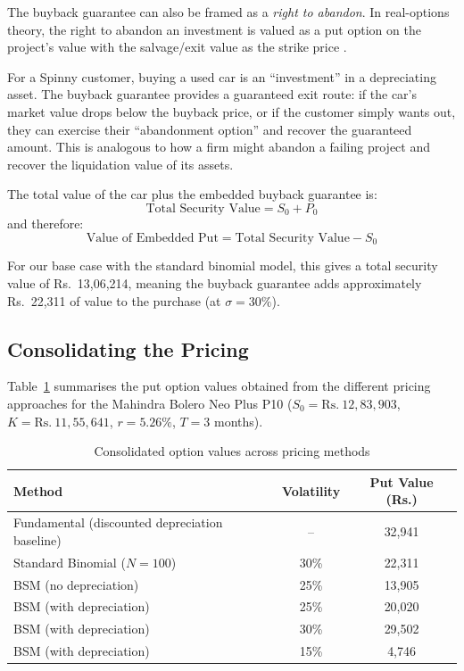 \documentclass[11pt, a4paper]{article}
\begin{document}
The buyback guarantee can also be framed as a \emph{right to abandon}. In real-options theory, the right to abandon an investment is valued as a put option on the project's value with the salvage/exit value as the strike price \cite{dixitpindyck1994, myers1977}.

For a Spinny customer, buying a used car is an ``investment'' in a depreciating asset. The buyback guarantee provides a guaranteed exit route: if the car's market value drops below the buyback price, or if the customer simply wants out, they can exercise their ``abandonment option'' and recover the guaranteed amount. This is analogous to how a firm might abandon a failing project and recover the liquidation value of its assets.

The total value of the car plus the embedded buyback guarantee is:
\begin{equation}
    \text{Total Security Value} = S_0 + P_0
\end{equation}
and therefore:
\begin{equation}
    \text{Value of Embedded Put} = \text{Total Security Value} - S_0
\end{equation}

For our base case with the standard binomial model, this gives a total security value of Rs.~13,06,214, meaning the buyback guarantee adds approximately Rs.~22,311 of value to the purchase (at $\sigma = 30\%$).


\subsection{Consolidating the Pricing}
\label{sec:consolidation}

Table~\ref{tab:consolidation} summarises the put option values obtained from the different pricing approaches for the Mahindra Bolero Neo Plus P10 ($S_0 = \text{Rs.}~12{,}83{,}903$, $K = \text{Rs.}~11{,}55{,}641$, $r = 5.26\%$, $T = 3$ months).

\begin{table}[H]
\centering
\caption{Consolidated option values across pricing methods}
\label{tab:consolidation}
\begin{tabular}{@{}lcc@{}}
\toprule
\textbf{Method} & \textbf{Volatility} & \textbf{Put Value (Rs.)} \\
\midrule
Fundamental (discounted depreciation baseline) & -- & 32,941 \\
Standard Binomial ($N = 100$) & 30\% & 22,311 \\
BSM (no depreciation) & 25\% & 13,905 \\
BSM (with depreciation) & 25\% & 20,020 \\
BSM (with depreciation) & 30\% & 29,502 \\
BSM (with depreciation) & 15\% & 4,746 \\
\bottomrule
\end{tabular}
\end{table}
\end{document}
